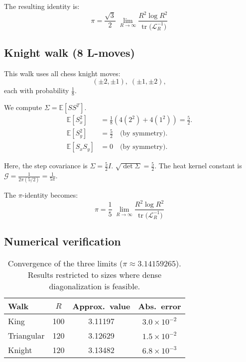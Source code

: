 \documentclass{article}
\numberwithin{equation}{section}
\theoremstyle{definition}
\theoremstyle{remark}
\newcommand{\cG}{\mathcal{G}}
\DeclareMathOperator{\tr}{tr}
\newcommand{\E}{\mathbb{E}}
\begin{document}
The resulting identity is:
\begin{equation}\label{eq:Tri_pi}
\boxed{\;\displaystyle \pi=\frac{\sqrt{3}}{2}\;\lim_{R\to\infty}\frac{R^{2}\log R^{2}}{\tr\!\bigl(\mathcal{L}_R^{-1}\bigr)}\;}
\end{equation}


\subsection{Knight walk (8 L-moves)}\label{app:knight}

This walk uses all chess knight moves:
\[
(\pm2,\pm1),\;(\pm1,\pm2),
\]
each with probability \( \tfrac{1}{8} \).

We compute $\Sigma = \E[S S^T]$.
\begin{align*}
\E[S_x^2] &= \frac{1}{8} \left( 4(2^2) + 4(1^2) \right) = \frac{5}{2}. \\
\E[S_y^2] &= \frac{5}{2} \quad \text{(by symmetry)}. \\
\E[S_x S_y] &= 0 \quad \text{(by symmetry)}.
\end{align*}

Here, the step covariance is \( \Sigma = \tfrac{5}{2} I \). $\sqrt{\det\Sigma} = \frac{5}{2}$.
The heat kernel constant is $\cG = \frac{1}{2\pi(5/2)} = \frac{1}{5\pi}$.

The $\pi$-identity becomes:
\begin{equation}\label{eq:Knight_pi}
\boxed{\;\displaystyle \pi=\frac{1}{5}\;\lim_{R\to\infty}\frac{R^{2}\log R^{2}}{\tr\!\bigl(\mathcal{L}_R^{-1}\bigr)}\;}
\end{equation}


\subsection{Numerical verification}\label{app:numerical}

\begin{table}[h]
\centering
\caption{Convergence of the three limits ($\pi\approx3.14159265$). Results restricted to sizes where dense diagonalization is feasible.}
\label{tab:numeric_pi}
\begin{tabular}{@{}lccc@{}}
\toprule
Walk & $R$ & Approx.\ value & Abs.\ error \\
\midrule
King & 100 & 3.11197 & $3.0 \times 10^{-2}$ \\
\addlinespace
Triangular & 120 & 3.12629 & $1.5\times10^{-2}$ \\
\addlinespace
Knight & 120 & 3.13482 & $6.8\times10^{-3}$ \\
\bottomrule
\end{tabular}
\end{table}
\end{document}
